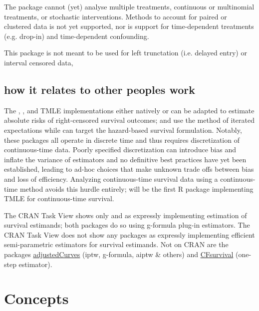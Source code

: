 \documentclass{report}
\newcommand{\1}{\ensuremath{\mathbf{1}}}
\begin{document}
The package cannot (yet) analyse multiple treatments, continuous or multinomial treatments, or stochastic interventions. Methods to account for paired or clustered data is not yet supported, nor is support for time-dependent treatments (e.g. drop-in) and time-dependent confounding.

This package is not meant to be used for left trunctation (i.e. delayed entry) or interval censored data, 

\subsection{how it relates to other peoples work}
\label{sec:org5513ad1}

The , , and  TMLE implementations either natively or can be adapted to estimate absolute risks of right-censored survival outcomes;  and  use the method of iterated expectations while  can target the hazard-based survival formulation. Notably, these packages all operate in discrete time and thus requires discretization of continuous-time data. Poorly specified discretization can introduce bias and inflate the variance of estimators and no definitive best practices have yet been established, leading to ad-hoc choices that make unknown trade offs between bias and loss of efficiency. Analyzing continuous-time survival data using a continuous-time method avoids this hurdle entirely;  will be the first R package implementing TMLE for continuous-time survival.

The  CRAN Task View shows only  and  as expressly implementing estimation of survival estimands; both packages do so using g-formula plug-in estimators. The  CRAN Task View does not show any packages as expressly implementing efficient semi-parametric estimators for survival estimands. Not on CRAN are the packages \href{https://github.com/RobinDenz1/adjustedCurves}{adjustedCurves} (iptw, g-formula, aiptw \& others) and \href{https://github.com/tedwestling/CFsurvival}{CFsurvival} (one-step estimator). 


\section{Concepts}
\label{sec:orgdbd46d6}
\end{document}
